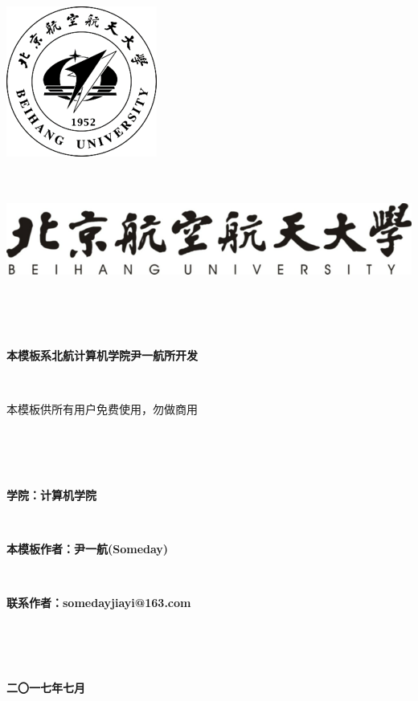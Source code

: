 \documentclass{ctexart}
\newcommand{\erhao}{\fontsize{21pt}\selectfont}
\newcommand{\sanhao}{\fontsize{15.75pt}\selectfont}
\newcommand{\sihao}{\fontsize{14pt}\selectfont}
\begin{document}
\lhead{}%
\rhead{}%


\setcounter{secnumdepth}{0}%





\includegraphics[scale=1]{include_picture/xiaohui.png}
\ \\ 
\ \\
\ \\
\begin{center}
\includegraphics[scale=1]{include_picture/xiaoming.png}
\end{center}
\ \\
\ \\
\ \\
\erhao
\centerline{\textbf{本模板系北航计算机学院尹一航所开发}} %
\ \\
\centerline{本模板供所有用户免费使用，勿做商用}
\ \\
\ \\
\ \\
\sihao
\centerline{\textbf{学院：计算机学院}}
\ \\
\centerline{\textbf{本模板作者：尹一航(Someday)}}
\ \\
\centerline{\textbf{联系作者：somedayjiayi@163.com}}
\ \\
\ \\ 
\ \\
\sanhao
\centerline{\textbf{二〇一七年七月}}
\end{document}
